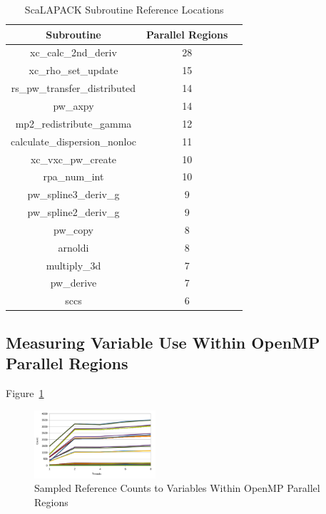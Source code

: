\begin{table}[htbp]
\caption{ScaLAPACK Subroutine Reference Locations}
\begin{center}
\begin{tabular}{|c|c|c|}
\hline
\textbf{Subroutine} & \textbf{Parallel Regions} \\
\hline
xc\_calc\_2nd\_deriv & 28 \\
\hline
xc\_rho\_set\_update & 15 \\
\hline
rs\_pw\_transfer\_distributed & 14 \\
\hline
pw\_axpy & 14 \\
\hline
mp2\_redistribute\_gamma & 12 \\
\hline
calculate\_dispersion\_nonloc & 11 \\
\hline
xc\_vxc\_pw\_create & 10 \\
\hline
rpa\_num\_int & 10 \\
\hline
pw\_spline3\_deriv\_g & 9 \\
\hline
pw\_spline2\_deriv\_g & 9 \\
\hline
pw\_copy & 8 \\
\hline
arnoldi & 8 \\
\hline
multiply\_3d & 7 \\
\hline
pw\_derive & 7 \\
\hline
sccs & 6 \\
\hline
\end{tabular}
\label{tab:foo}
\end{center}
\end{table}


\subsection{Measuring Variable Use Within OpenMP Parallel Regions}

Figure~\ref{fig:openmp-refcount}

\begin{figure}
\begin{center}
\includegraphics[width=0.4\textwidth]{images/cp2k-omp-inc-full.pdf}
\end{center}
\caption{Sampled Reference Counts to Variables Within OpenMP Parallel Regions}
\label{fig:openmp-refcount}
\end{figure}
